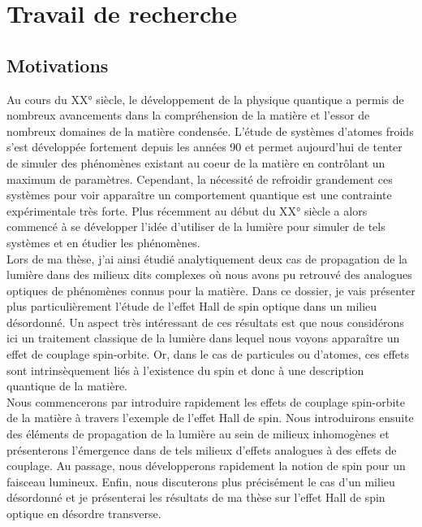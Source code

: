 \documentclass[a4paper,11pt]{article} %
\begin{document}
	
	\section{Travail de recherche}
	\subsection{Motivations}
	Au cours du XX° siècle, le développement de la physique quantique a permis de nombreux avancements dans la compréhension de la matière et l'essor de nombreux domaines de la matière condensée. L'étude de systèmes d'atomes froids s'est développée fortement depuis les années 90 et permet aujourd'hui de tenter de simuler des phénomènes existant au coeur de la matière en contrôlant un maximum de paramètres. Cependant, la nécessité de refroidir grandement ces systèmes pour voir apparaître un comportement quantique est une contrainte expérimentale très forte. Plus récemment au début du XX° siècle a alors commencé à se développer l'idée d'utiliser de la lumière pour simuler de tels systèmes et en étudier les phénomènes.\\
	
	Lors de ma thèse, j'ai ainsi étudié analytiquement deux cas de propagation de la lumière dans des milieux dits complexes où nous avons pu retrouvé des analogues optiques de phénomènes connus pour la matière. Dans ce dossier, je vais présenter plus particulièrement l'étude de l'effet Hall de spin optique dans un milieu désordonné. Un aspect très intéressant de ces résultats est que nous considérons ici un traitement classique de la lumière dans lequel nous voyons apparaître un effet de couplage spin-orbite. Or, dans le cas de particules ou d'atomes, ces effets sont intrinsèquement liés à l'existence du spin et donc à une description quantique de la matière.\\
	
	Nous commencerons par introduire rapidement les effets de couplage spin-orbite de la matière à travers l'exemple de l'effet Hall de spin. Nous introduirons ensuite des éléments de propagation de la lumière au sein de milieux inhomogènes et présenterons l'émergence dans de tels milieux d'effets analogues à des effets de couplage. Au passage, nous développerons rapidement la notion de spin pour un faisceau lumineux. Enfin, nous discuterons plus précisément le cas d'un milieu désordonné et je présenterai les résultats de ma thèse sur l'effet Hall de spin optique en désordre transverse.\\
	
\end{document}

